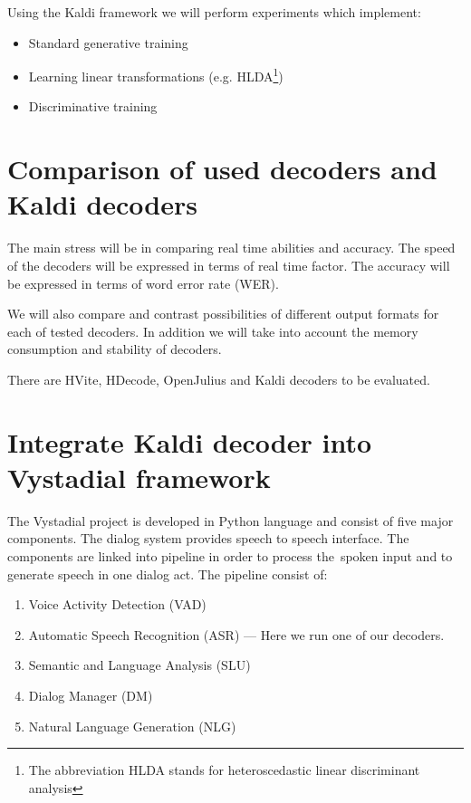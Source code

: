 Using the Kaldi framework we will perform experiments which implement:
\begin{itemize}
    \item Standard generative training
    \item Learning linear transformations (e.g. HLDA\footnote{The abbreviation HLDA stands for heteroscedastic linear discriminant analysis})
    \item Discriminative training 
\end{itemize}

 

\section{Comparison of used decoders and Kaldi decoders} 
\label{sec:compare_rt}
The main stress will be in comparing real time abilities and accuracy.
The speed of the decoders will be expressed in terms of real time factor.
The accuracy will be expressed in terms of word error rate (WER).

We will also compare and contrast possibilities of different output formats for each of tested decoders.
In addition we will take into account the memory consumption and stability of decoders.

There are HVite, HDecode, OpenJulius and Kaldi decoders to be evaluated.

\section{Integrate Kaldi decoder into Vystadial framework} 
\label{sec:integrate_kaldi_decoder_into_vystadial_framework}
The Vystadial project is developed in Python language and consist of five major components.
The dialog system provides speech to speech interface. The components are linked into pipeline in order to process the~spoken input and to generate speech in one dialog act.
The pipeline consist of:
\begin{enumerate}
    \item Voice Activity Detection (VAD)
    \item Automatic Speech Recognition (ASR) --- Here we run one of our decoders.
    \item Semantic and Language Analysis (SLU)
    \item Dialog Manager (DM)
    \item Natural Language Generation (NLG)
\end{enumerate}

